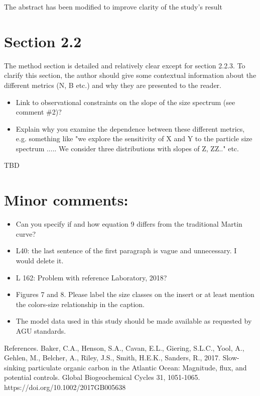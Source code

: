 \documentclass[12pt,letter]{article}
\begin{document}
{\color{blue}The abstract has been modified to improve clarity of the study's result}

\section*{Section 2.2}
The method section is detailed and relatively clear except for section 2.2.3. To clarify this section, the author should give some contextual information about the different metrics (N, B etc.) and why they are presented to the reader. 
\begin{itemize}
	\item Link to observational constraints on the slope of the size spectrum (see comment \#2)?
	
	\item Explain why you examine the dependence between these different metrics, e.g. something like "we explore the sensitivity of X and Y to the particle size spectrum ..... We consider three distributions with slopes of Z, ZZ.." etc.
\end{itemize}

{\color{red} TBD}

\section*{Minor comments:}
\begin{itemize}	
	\item Can you specify if and how equation 9 differs from the traditional Martin curve?
	
	\item L40: the last sentence of the first paragraph is vague and unnecessary. I would delete it.
	\item L 162: Problem with reference Laboratory, 2018?
	
	\item Figures 7 and 8. Please label the size classes on the insert or at least mention the colors-size relationship in the caption.
	
	\item The model data used in this study should be made available as requested by AGU standards.
\end{itemize}

References. 
Baker, C.A., Henson, S.A., Cavan, E.L., Giering, S.L.C., Yool, A., Gehlen, M., Belcher, A., Riley, J.S., Smith, H.E.K., Sanders, R., 2017. Slow-sinking particulate organic carbon in the Atlantic Ocean: Magnitude, flux, and potential controls. Global Biogeochemical Cycles 31, 1051-1065. https://doi.org/10.1002/2017GB005638\\
\end{document}
